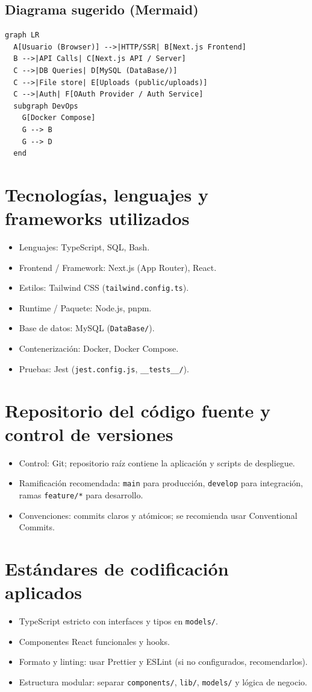 \documentclass[12pt]{report}
\begin{document}
\subsection*{Diagrama sugerido (Mermaid)}
\begin{verbatim}
graph LR
  A[Usuario (Browser)] -->|HTTP/SSR| B[Next.js Frontend]
  B -->|API Calls| C[Next.js API / Server]
  C -->|DB Queries| D[MySQL (DataBase/)]
  C -->|File store| E[Uploads (public/uploads)]
  C -->|Auth| F[OAuth Provider / Auth Service]
  subgraph DevOps
    G[Docker Compose]
    G --> B
    G --> D
  end
\end{verbatim}

\section{Tecnologías, lenguajes y frameworks utilizados}
\begin{itemize}
  \item Lenguajes: TypeScript, SQL, Bash.
  \item Frontend / Framework: Next.js (App Router), React.
  \item Estilos: Tailwind CSS (\texttt{tailwind.config.ts}).
  \item Runtime / Paquete: Node.js, pnpm.
  \item Base de datos: MySQL (\texttt{DataBase/}).
  \item Contenerización: Docker, Docker Compose.
  \item Pruebas: Jest (\texttt{jest.config.js}, \texttt{__tests__/}).
\end{itemize}

\section{Repositorio del código fuente y control de versiones}
\begin{itemize}
  \item Control: Git; repositorio raíz contiene la aplicación y scripts de despliegue.
  \item Ramificación recomendada: \texttt{main} para producción, \texttt{develop} para integración, ramas \texttt{feature/*} para desarrollo.
  \item Convenciones: commits claros y atómicos; se recomienda usar Conventional Commits.
\end{itemize}

\section{Estándares de codificación aplicados}
\begin{itemize}
  \item TypeScript estricto con interfaces y tipos en \texttt{models/}.
  \item Componentes React funcionales y hooks.
  \item Formato y linting: usar Prettier y ESLint (si no configurados, recomendarlos).
  \item Estructura modular: separar \texttt{components/}, \texttt{lib/}, \texttt{models/} y lógica de negocio.
\end{itemize}
\end{document}
